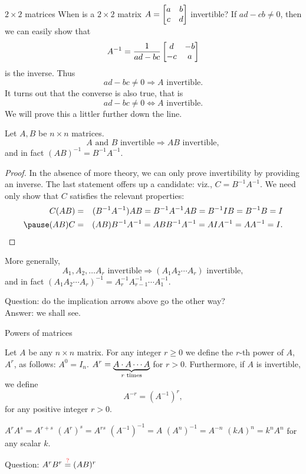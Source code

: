 \begin{frame}{$2\times 2$ matrices}
When is a $2\times 2$ matrix $A=\begin{bmatrix}a&b\\ c&d \end{bmatrix}$ invertible?
\bpause 
If $ad-cb\ne 0$, then we can easily show that 
\[
A^{-1}=\frac{1}{ad-bc}\begin{bmatrix}d&-b\\ -c&a \end{bmatrix}
\]
is the inverse. 
\bpause 
Thus 
\[ ad-bc\ne 0\Rightarrow  A \text{ invertible} .\]
\bpause It turns out that the converse is also true, that is 
\[ ad-bc\ne 0\Leftrightarrow  A \text{ invertible} .\]
We will prove this a littler further down the line. 
\end{frame}
\begin{frame}\footnotesize
\begin{theorem}
Let $A,B$ be $n\times n$ matrices.
\[
A \text{ and } B  \text{ invertible}\Rightarrow AB \text{ invertible},
\]
and in fact $(AB)^{-1}=B^{-1}A^{-1}$. 
\end{theorem}
\pause
\begin{proof}
In the absence of more theory, we can only prove invertibility by providing an inverse. The last statement offers up a candidate: viz., $C=B^{-1}A^{-1}$. We need only show that $C$ satisfies the relevant properties: 
\begin{eqnarray*}
C(AB)&=&(B^{-1}A^{-1})AB=B^{-1}A^{-1}AB=B^{-1}IB=B^{-1}B=I\\
\pause
(AB)C&=&(AB)B^{-1}A^{-1}=ABB^{-1}A^{-1}=AIA^{-1}=AA^{-1}=I.
\end{eqnarray*}
\end{proof}
\pause
\begin{corollary}
More generally, 
\[
A_1,A_2,\dots A_r \text{ invertible}\Rightarrow (A_1A_2\cdots A_r)\text{ invertible},
\]
and in fact $(A_1A_2\cdots A_r)^{-1}=A_r^{-1}A_{r-1}^{-1}\cdots A_1^{-1}$. 
\end{corollary}
\pause \alert{Question:} do the implication arrows above go the other way?\\ \pause \alert{Answer:} we shall see. 
\end{frame}
\begin{frame}{Powers of matrices}
\footnotesize
\begin{definition}
Let $A$ be any $n\times n$ matrix. For any integer $r\geq 0$ we define the $r$-th power of $A$, $A^{r}$, as follows: 
\bb[i]
\pause\ii $A^0=I_n$. 
\pause\ii $\displaystyle A^r=\underbrace{A\cdot A\cdots A}_{r \text{ times}}$ for $r>0$.
\ee
\pause Furthermore, if $A$ is \alert{invertible}, we define 
\[
A^{-r}=\left(A^{-1}\right)^r,
\] 
for any positive integer $r>0$. 
\end{definition}
\pause
\begin{theorem}
\begin{multicols}{2}
\bb[(a)]
\ii $A^{r}A^s=A^{r+s}$
\ii $(A^r)^s=A^{rs}$
\ii $\left(A^{-1}\right)^{-1}=A$
\ii $\left(A^n\right)^{-1}=A^{-n}$
\ii $(kA)^n=k^nA^n$ for any scalar $k$. 
\ee
\end{multicols}
\end{theorem}
\pause\alert{Question:} $A^rB^r\stackrel{\large{\color{red}?}}{=}(AB)^r$
\end{frame}
